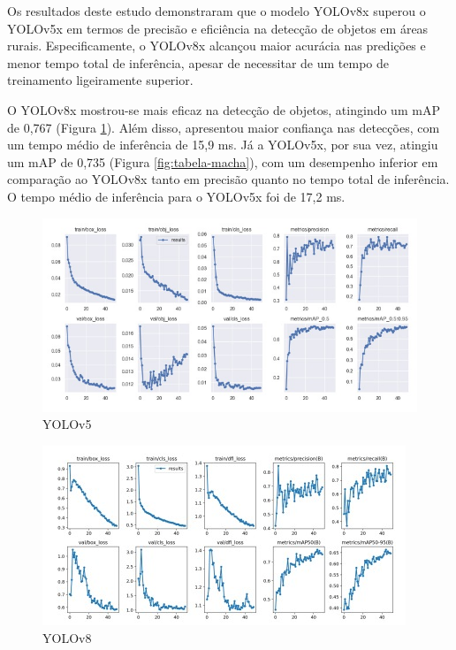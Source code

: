 Os resultados deste estudo demonstraram que o modelo YOLOv8x superou o YOLOv5x em termos de precisão e eficiência na detecção de objetos em áreas rurais. Especificamente, o YOLOv8x alcançou maior acurácia nas predições e menor tempo total de inferência, apesar de necessitar de um tempo de treinamento ligeiramente superior.

O YOLOv8x mostrou-se mais eficaz na detecção de objetos, atingindo um mAP de 0,767 (Figura \ref{fig:yolov5}). Além disso, apresentou maior confiança nas detecções, com um tempo médio de inferência de 15,9 ms. Já a YOLOv5x, por sua vez, atingiu um mAP de 0,735 (Figura \ref{fig:tabela-macha}), com um desempenho inferior em comparação ao YOLOv8x tanto em precisão quanto no tempo total de inferência. O tempo médio de inferência para o YOLOv5x foi de 17,2 ms.
\begin{figure}[!h]
    \center
    \begin{minipage}{0.9\linewidth}
        \center
        \captionsetup{justification=centering,margin=0.5cm,font=small}
        \includegraphics[width=0.7\linewidth]{img/cap3/yolov5artigo.jpeg}
        \caption{YOLOv5 \cite{diascomparaccao}}
        \label{fig:yolov5}
    \end{minipage}
\end{figure}

\begin{figure}[!h]
    \center
    \begin{minipage}{0.9\linewidth}
        \center
        \captionsetup{justification=centering,margin=0.5cm,font=small}
        \includegraphics[width=0.7\linewidth]{img/cap3/yolov8artigo.jpeg}
        \caption{YOLOv8 \cite{diascomparaccao}}
        \label{fig:yolov8}
    \end{minipage}
\end{figure}

